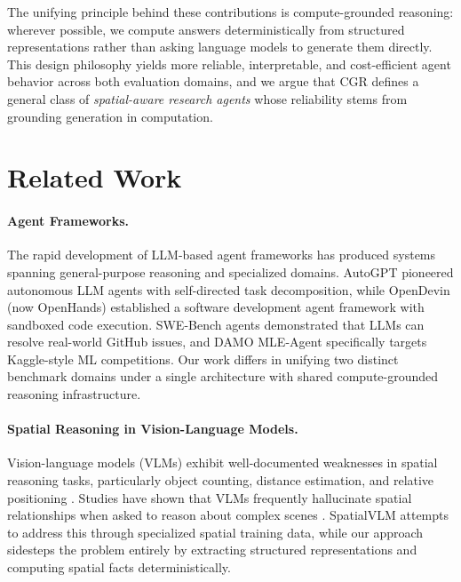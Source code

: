 \documentclass[11pt]{article}
\begin{document}
The unifying principle behind these contributions is compute-grounded reasoning: wherever possible, we compute answers deterministically from structured representations rather than asking language models to generate them directly. This design philosophy yields more reliable, interpretable, and cost-efficient agent behavior across both evaluation domains, and we argue that CGR defines a general class of \emph{spatial-aware research agents} whose reliability stems from grounding generation in computation.

\section{Related Work}
\label{sec:related}

\paragraph{Agent Frameworks.}
The rapid development of LLM-based agent frameworks has produced systems spanning general-purpose reasoning and specialized domains. AutoGPT \citep{autogpt2023} pioneered autonomous LLM agents with self-directed task decomposition, while OpenDevin (now OpenHands) \citep{hong2024opendevin} established a software development agent framework with sandboxed code execution. SWE-Bench agents \citep{jimenez2024swebench} demonstrated that LLMs can resolve real-world GitHub issues, and DAMO MLE-Agent \citep{zhang2024mleagent} specifically targets Kaggle-style ML competitions. Our work differs in unifying two distinct benchmark domains under a single architecture with shared compute-grounded reasoning infrastructure.

\paragraph{Spatial Reasoning in Vision-Language Models.}
Vision-language models (VLMs) exhibit well-documented weaknesses in spatial reasoning tasks, particularly object counting, distance estimation, and relative positioning \citep{liu2024llava, chen2024spatialvlm}. Studies have shown that VLMs frequently hallucinate spatial relationships when asked to reason about complex scenes \citep{li2023evaluating}. SpatialVLM \citep{chen2024spatialvlm} attempts to address this through specialized spatial training data, while our approach sidesteps the problem entirely by extracting structured representations and computing spatial facts deterministically.
\end{document}
